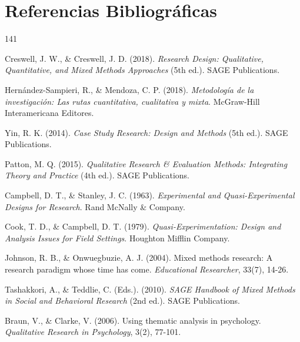 
\chapter*{Referencias Bibliográficas}
\label{ch:referencias}

\begin{thebibliography}{141}


Creswell, J. W., \& Creswell, J. D. (2018). \textit{Research Design: Qualitative, Quantitative, and Mixed Methods Approaches} (5th ed.). SAGE Publications.

Hernández-Sampieri, R., \& Mendoza, C. P. (2018). \textit{Metodología de la investigación: Las rutas cuantitativa, cualitativa y mixta}. McGraw-Hill Interamericana Editores.

Yin, R. K. (2014). \textit{Case Study Research: Design and Methods} (5th ed.). SAGE Publications.

Patton, M. Q. (2015). \textit{Qualitative Research \& Evaluation Methods: Integrating Theory and Practice} (4th ed.). SAGE Publications.

Campbell, D. T., \& Stanley, J. C. (1963). \textit{Experimental and Quasi-Experimental Designs for Research}. Rand McNally \& Company.

Cook, T. D., \& Campbell, D. T. (1979). \textit{Quasi-Experimentation: Design and Analysis Issues for Field Settings}. Houghton Mifflin Company.

Johnson, R. B., \& Onwuegbuzie, A. J. (2004). Mixed methods research: A research paradigm whose time has come. \textit{Educational Researcher}, 33(7), 14-26.

Tashakkori, A., \& Teddlie, C. (Eds.). (2010). \textit{SAGE Handbook of Mixed Methods in Social and Behavioral Research} (2nd ed.). SAGE Publications.

Braun, V., \& Clarke, V. (2006). Using thematic analysis in psychology. \textit{Qualitative Research in Psychology}, 3(2), 77-101.


\end{thebibliography}

